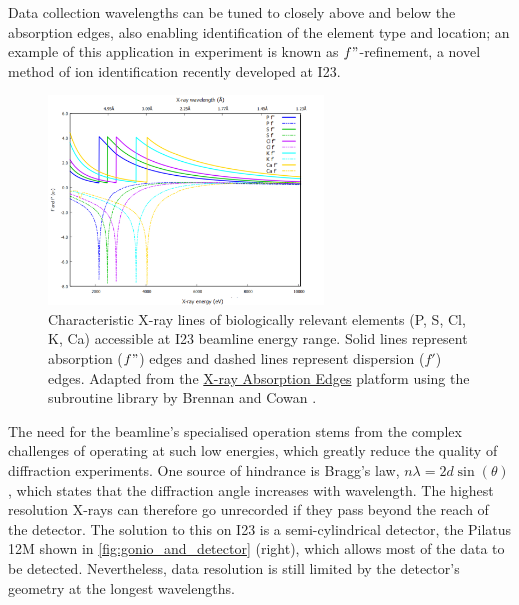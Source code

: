 Data collection wavelengths can be tuned to closely above and below the absorption edges, also enabling identification of the element type and location; an example of this application in experiment is known as $f"$-refinement, a novel method of ion identification recently developed at I23. %

\begin{figure}[h]
    \centering
    \includegraphics[width = 0.65\textwidth]{images/absorption lines high quality cropped.png}
    \caption{Characteristic X-ray lines of biologically relevant elements (P, S, Cl, K, Ca) accessible at I23 beamline energy range. Solid lines represent absorption ($f"$) edges and dashed lines represent dispersion ($f'$) edges. Adapted from the \href{http://skuld.bmsc.washington.edu/scatter/AS_periodic.html}{X-ray Absorption Edges} platform using the subroutine library by Brennan and Cowan \cite{Brennan1992}.}%
    \label{Anomaluos scattering edges}
\end{figure}

The need for the beamline's specialised operation stems from the complex challenges of operating at such low energies, which greatly reduce the quality of diffraction experiments.
One source of hindrance is Bragg’s law, $nλ = 2d \sin(\theta)$, which states that the diffraction angle increases with wavelength. The highest resolution X-rays can therefore go unrecorded if they pass beyond the reach of the detector. The solution to this on I23 is a semi-cylindrical detector, the Pilatus 12M shown in \cref{fig:gonio_and_detector} (right), which allows most of the data to be detected. Nevertheless, data resolution is still limited by the detector’s geometry at the longest wavelengths.


